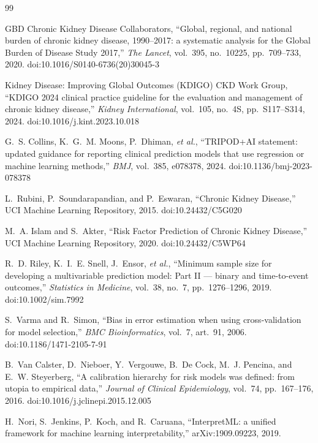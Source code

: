 \documentclass[conference]{IEEEtran}
\begin{document}
\begin{thebibliography}{99}

GBD Chronic Kidney Disease Collaborators,
``Global, regional, and national burden of chronic kidney disease, 1990--2017:
a systematic analysis for the Global Burden of Disease Study 2017,''
\emph{The Lancet}, vol.~395, no.~10225, pp.~709--733, 2020.
doi:10.1016/S0140-6736(20)30045-3

Kidney Disease: Improving Global Outcomes (KDIGO) CKD Work Group,
``KDIGO 2024 clinical practice guideline for the evaluation and management of
chronic kidney disease,''
\emph{Kidney International}, vol.~105, no.~4S, pp.~S117--S314, 2024.
doi:10.1016/j.kint.2023.10.018

G.~S. Collins, K.~G.~M. Moons, P.~Dhiman, \emph{et al.},
``TRIPOD+AI statement: updated guidance for reporting clinical prediction
models that use regression or machine learning methods,''
\emph{BMJ}, vol.~385, e078378, 2024.
doi:10.1136/bmj-2023-078378

L.~Rubini, P.~Soundarapandian, and P.~Eswaran,
``Chronic Kidney Disease,'' UCI Machine Learning Repository, 2015.
doi:10.24432/C5G020

M.~A. Islam and S.~Akter,
``Risk Factor Prediction of Chronic Kidney Disease,''
UCI Machine Learning Repository, 2020.
doi:10.24432/C5WP64

R.~D. Riley, K.~I.~E. Snell, J.~Ensor, \emph{et al.},
``Minimum sample size for developing a multivariable prediction model:
Part II --- binary and time-to-event outcomes,''
\emph{Statistics in Medicine}, vol.~38, no.~7, pp.~1276--1296, 2019.
doi:10.1002/sim.7992

S.~Varma and R.~Simon,
``Bias in error estimation when using cross-validation for model selection,''
\emph{BMC Bioinformatics}, vol.~7, art.~91, 2006.
doi:10.1186/1471-2105-7-91

B.~Van Calster, D.~Nieboer, Y.~Vergouwe, B.~De Cock, M.~J. Pencina, and
E.~W. Steyerberg,
``A calibration hierarchy for risk models was defined: from utopia to
empirical data,''
\emph{Journal of Clinical Epidemiology}, vol.~74, pp.~167--176, 2016.
doi:10.1016/j.jclinepi.2015.12.005

H.~Nori, S.~Jenkins, P.~Koch, and R.~Caruana,
``InterpretML: a unified framework for machine learning interpretability,''
arXiv:1909.09223, 2019.


\end{thebibliography}
\end{document}
